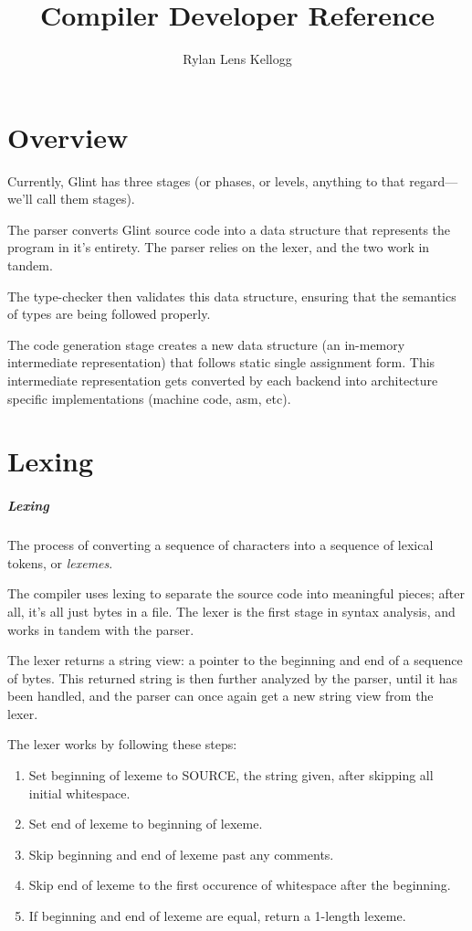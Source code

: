 \documentclass[
12pt,
letterpaper,
oneside,
]{memoir}
\title{\lang Compiler Developer Reference}
\author{Rylan Lens Kellogg}
\newcommand{\lang}{Glint
}
\begin{document}
\maketitle
\clearpage

\tableofcontents
\clearpage

\chapter{Overview}

Currently, \lang has three stages (or phases, or levels, anything to that regard---we'll call them stages).

The parser converts \lang source code into a data structure that represents the program in it's entirety. The parser relies on the lexer, and the two work in tandem.

The type-checker then validates this data structure, ensuring that the semantics of types are being followed properly.

The code generation stage creates a new data structure (an in-memory intermediate representation) that follows static single assignment form.
This intermediate representation gets converted by each backend into
architecture specific implementations (machine code, asm, etc).

\chapter{Lexing}

\paragraph{Lexing} The process of converting a sequence of characters into a sequence of lexical tokens, or \emph{lexemes}.

The compiler uses lexing to separate the source code into meaningful pieces; after all, it's all just bytes in a file. The lexer is the first stage in syntax analysis, and works in tandem with the parser.

The lexer returns a string view: a pointer to the beginning and end of a sequence of bytes. This returned string is then further analyzed by the parser, until it has been handled, and the parser can once again get a new string view from the lexer.

\filbreak

The lexer works by following these steps:

\begin{enumerate}
\item Set beginning of lexeme to SOURCE, the string given, after skipping all initial whitespace.
\item Set end of lexeme to beginning of lexeme.
\item Skip beginning and end of lexeme past any comments.
\item Skip end of lexeme to the first occurence of whitespace after the beginning.
\item If beginning and end of lexeme are equal, return a 1-length lexeme.
\end{enumerate}
\end{document}

